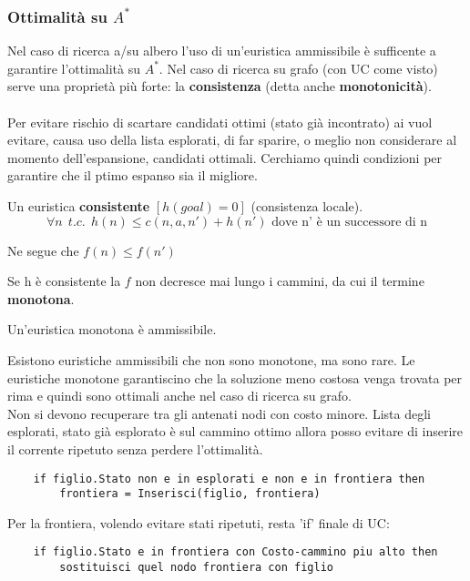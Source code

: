 \subsubsection{Ottimalità su $A^*$}
Nel caso di ricerca a/su albero l'uso di un'euristica ammissibile è sufficente a garantire l'ottimalità su $A^*$.
Nel caso di ricerca su grafo (con UC come visto) serve una proprietà più forte: la \textbf{consistenza} (detta anche \textbf{monotonicità}).\\\\
Per evitare rischio di scartare candidati ottimi (stato già incontrato) ai vuol evitare, causa uso della lista esplorati, di far sparire, o meglio
non considerare al momento dell'espansione, candidati ottimali. Cerchiamo quindi condizioni per garantire che il ptimo espanso sia il migliore.
\begin{definition} 
    Un euristica \textbf{consistente} $[h(goal) = 0]$ (consistenza locale).
    $$\forall n \:\: t.c. \:\: h(n) \leq c(n, a, n') + h(n') \text{ dove n' è un successore di n}$$
\end{definition}
\hspace{-15pt}Ne segue che $f(n) \leq f(n')$
\begin{note}
    Se h è consistente la $f$ non decresce mai lungo i cammini, da cui il termine \textbf{monotona}.
\end{note}
\begin{theorem}
    Un'euristica monotona è ammissibile.
\end{theorem}
\hspace{-15pt}Esistono euristiche ammissibili che non sono monotone, ma sono rare. Le euristiche monotone garantiscino che la soluzione meno costosa 
venga trovata per rima e quindi sono ottimali anche nel caso di ricerca su grafo.\\
Non si devono recuperare tra gli antenati nodi con costo minore. Lista degli esplorati, stato già esplorato è sul cammino ottimo allora posso
evitare di inserire il corrente ripetuto senza perdere l'ottimalità.
\begin{lstlisting}
    if figlio.Stato non e in esplorati e non e in frontiera then
        frontiera = Inserisci(figlio, frontiera)
\end{lstlisting}
Per la frontiera, volendo evitare stati ripetuti, resta 'if' finale di UC:
\begin{lstlisting}
    if figlio.Stato e in frontiera con Costo-cammino piu alto then
        sostituisci quel nodo frontiera con figlio 
\end{lstlisting}
